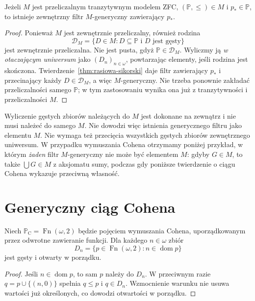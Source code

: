 \begin{wniosek}
\label{cor:countable-generic}
Jeżeli $M$ jest przeliczalnym tranzytywnym
modelem ZFC, $(\mathbb P,\leq)\in M$
i $p_*\in\mathbb P$, to istnieje zewnętrzny
filtr $M$-generyczny zawierający $p_*$.
\end{wniosek}
\begin{proof}
Ponieważ $M$ jest zewnętrznie przeliczalny,
również rodzina
\[
 \mathcal D_M=
 \{D\in M:D\subseteq\mathbb P
              \text{ i }D\text{ jest gęsty}\}
\]
jest zewnętrznie przeliczalna.
Nie jest pusta, gdyż
$\mathbb P\in\mathcal D_M$.
Wyliczmy ją \emph{w otaczającym uniwersum}
jako $(D_n)_{n\in\omega}$,
powtarzając elementy, jeśli rodzina jest skończona.
Twierdzenie~\ref{thm:rasiowa-sikorski}
daje filtr zawierający $p_*$ i przecinający
każdy $D\in\mathcal D_M$, a więc $M$-generyczny.
Nie trzeba ponownie zakładać przeliczalności
samego $\mathbb P$; w tym zastosowaniu wynika ona
już z tranzytywności i przeliczalności $M$.
\end{proof}

\begin{uwaga}
\label{rem:forcing-external-generic}
Wyliczenie gęstych zbiorów należących do $M$
jest dokonane na zewnątrz i nie musi należeć
do samego $M$. Nie dowodzi więc istnienia
generycznego filtru jako elementu $M$.
Nie wymaga też przecięcia wszystkich
gęstych zbiorów zewnętrznego uniwersum.
W przypadku wymuszania Cohena
otrzymamy poniżej przykład, w którym
\emph{żaden} filtr $M$-generyczny
nie może być elementem $M$:
gdyby $G\in M$, to także $\bigcup G\in M$
z aksjomatu sumy, podczas gdy
poniższe twierdzenie o ciągu Cohena
wykazuje przeciwną własność.
\end{uwaga}

\section{Generyczny ciąg Cohena}
\begin{lemat}
\label{lem:cohen-coordinates}
Niech $\mathbb P_{\mathrm C}=\operatorname{Fn}(\omega,2)$
będzie pojęciem wymuszania Cohena, uporządkowanym
przez odwrotne zawieranie funkcji.
Dla każdego $n\in\omega$ zbiór
\[
 D_n=\{p\in\operatorname{Fn}(\omega,2):
                         n\in\operatorname{dom}p\}
\]
jest gęsty i otwarty w porządku.
\end{lemat}
\begin{proof}
Jeśli $n\in\operatorname{dom}p$,
to sam $p$ należy do $D_n$.
W przeciwnym razie $q=p\cup\{(n,0)\}$
spełnia $q\leq p$ i $q\in D_n$.
Wzmocnienie warunku nie usuwa wartości
już określonych, co dowodzi otwartości
w porządku.
\end{proof}


